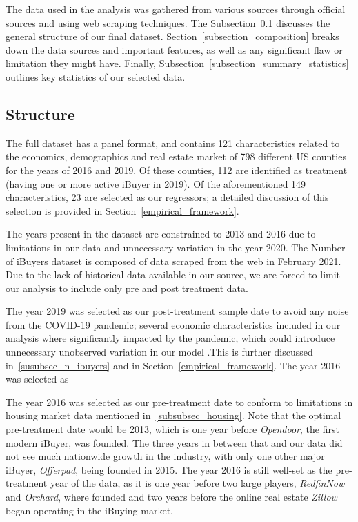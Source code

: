 The data used in the analysis was gathered from various sources through official sources and using web scraping techniques. The Subsection~\ref{subsection_structure} discusses the general structure of our final dataset. Section~\ref{subsection_composition} breaks down the data sources and important features, as well as any significant flaw or limitation they might have. Finally, Subsection~\ref{subsection_summary_statistics} outlines key statistics of our selected data. 

\subsection{Structure}\label{subsection_structure}
The full dataset has a panel format, and contains 121 characteristics related to the economics, demographics and real estate market of 798 different US counties for the years of 2016 and 2019. Of these counties, 112 are identified as treatment (having one or more active iBuyer in 2019). Of the aforementioned 149 characteristics, 23 are selected as our regressors; a detailed discussion of this selection is provided in Section~\ref{empirical_framework}.

The years present in the dataset are constrained to 2013 and 2016 due to limitations in our data and unnecessary variation in the year 2020. The Number of iBuyers dataset is composed of data scraped from the web in February 2021. Due to the lack of historical data available in our source, we are forced to limit our analysis to include only pre and post treatment data. 

The year 2019 was selected as our post-treatment sample date to avoid any noise from the COVID-19 pandemic; several economic characteristics included in our analysis where significantly impacted by the pandemic, which could introduce unnecessary unobserved variation in our model .This is further discussed in~\ref{susubsec_n_ibuyers} and in Section~\ref{empirical_framework}. The year 2016 was selected as 

The year 2016 was selected as our pre-treatment date to conform to limitations in housing market data mentioned in~\ref{subsubsec_housing}. Note that the optimal pre-treatment date would be 2013, which is one year before \textit{Opendoor}, the first modern iBuyer, was founded. The three years in between that and our data did not see much nationwide growth in the industry, with only one other major iBuyer, \textit{Offerpad}, being founded in 2015. The year 2016 is still well-set as the pre-treatment year of the data, as it is one year before two large players, \textit{RedfinNow} and \textit{Orchard}, where founded and two years before the online real estate \textit{Zillow} began operating in the iBuying market.

